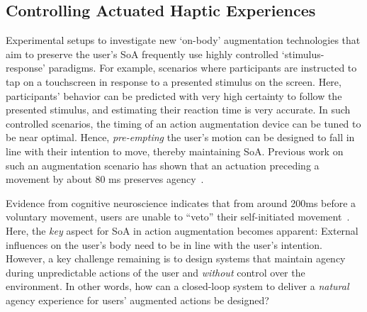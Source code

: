 \subsection{Controlling Actuated Haptic Experiences}

Experimental setups to investigate new `on-body' augmentation technologies that aim to preserve the user's SoA frequently use highly controlled `stimulus-response' paradigms. For example, scenarios where participants are instructed to tap on a touchscreen in response to a presented stimulus on the screen. Here, participants' behavior can be predicted with very high certainty to follow the presented stimulus, and estimating their reaction time is very accurate. In such controlled scenarios, the timing of an action augmentation device can be tuned to be near optimal. Hence, \textit{pre-empting} the user's motion can be designed to fall in line with their intention to move, thereby maintaining SoA. Previous work on such an augmentation scenario has shown that an actuation preceding a movement by about 80 ms preserves agency~\cite{Kasahara2019-sk, Kasahara2021-gy}.

Evidence from cognitive neuroscience indicates that from around 200ms before a voluntary movement, users are unable to ``veto'' their self-initiated movement~\cite{Schultze-Kraft2016-bx}. Here, the \textit{key} aspect for SoA in action augmentation becomes apparent: External influences on the user's body need to be in line with the user's intention. However, a key challenge remaining is to design systems that maintain agency during unpredictable actions of the user and \textit{without} control over the environment. In other words, how can a closed-loop system to deliver a \textit{natural} agency experience for users' augmented actions be designed?


